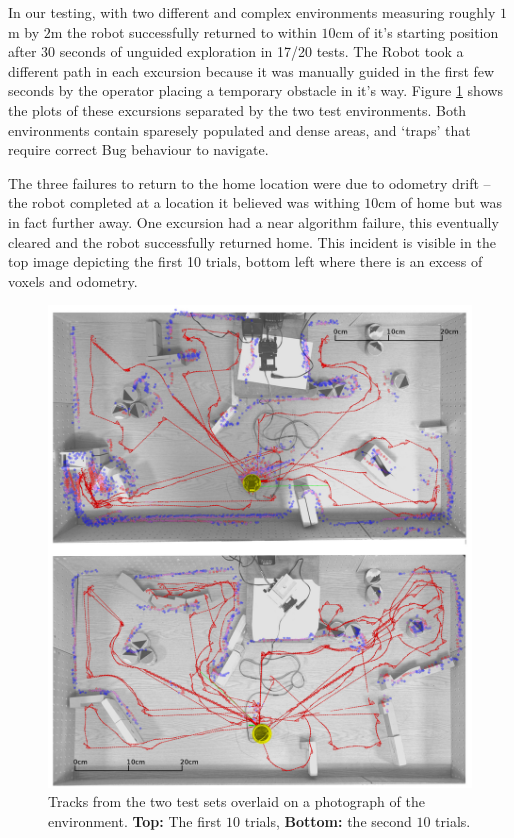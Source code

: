 \documentclass[11pt, a4paper]{article}
\begin{document}
In our testing, with two different and complex environments measuring roughly $1$m by $2$m the robot
successfully returned to within $10$cm of it's starting position after 30 seconds of unguided exploration
in 17/20 tests. The Robot took a different path in each excursion because it was manually guided in the 
first few seconds by the operator placing a temporary obstacle in it's way. Figure \ref{resultsfigure} 
shows the plots of these excursions separated by the two test environments. Both environments contain
sparesely populated and dense areas, and `traps' that require correct Bug behaviour to navigate.

The three failures to return to the home location were due to odometry drift -- the robot completed at a
location it believed was withing $10$cm of home but was in fact further away. One excursion had a near
algorithm failure, this eventually cleared and the robot successfully returned home. This incident
is visible in the top image depicting the first 10 trials, bottom left where there is an excess of 
voxels and odometry.

\begin{figure}[H]
  \begin{center}
    \includegraphics[width=35em]{../assets/multi_explore_figure.jpg}
  \end{center}
  \caption{\label{resultsfigure} Tracks from the two test sets overlaid on a photograph of the environment.
  \textbf{Top:} The first $10$ trials, \textbf{Bottom:} the second $10$ trials.}
\end{figure} 
\end{document}
